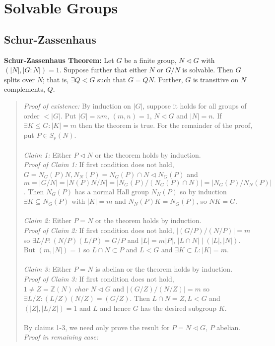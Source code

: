 \chapter{Solvable Groups}
\section {Schur-Zassenhaus}
{\bf Schur-Zassenhaus Theorem:} Let $G$ be a finite group,
$N \lhd G$ with $(|N|, |G:N|)=1$.  Suppose further
that either $N$ or $G/N$ is
solvable. Then $G$ splits over $N$; that is,
$\exists Q < G$ such that $G= QN$.
Further, $G$ is transitive on $N$ complements, $Q$.
\begin{quote}
\emph {Proof of existence:}
By induction on $|G|$, suppose it holds for all groups of order $<|G|$. Put $|G|=nm$,
$(m,n)=1$, $N \lhd G$ and $|N|= n$.  If $\exists K \le G: |K|=m$ then the theorem is true.
For the remainder of the proof, put $P \in S_p(N)$.  
\\
\\
\emph{Claim 1:} Either $P \lhd N$ or the theorem holds by induction.
\\
\emph{Proof of Claim 1:} 
If first condition does not hold,
$G=N_G(P)N, N_N(P)=N_G(P) \cap N \lhd N_G(P)$ and 
$m=|G/N|=|N(P)N/N|=|N_G (P)/(N_G (P) \cap N)|= |N_G(P)/N_N(P)|$.
Then $N_G(P)$ has a
normal Hall group $N_N(P)$ so by induction $\exists K \subseteq N_G(P)$ with
$|K|=m$ and $N_N(P)K=N_G(P)$, so $NK=G$. 
\\
\\
\emph{Claim 2:} Either $P = N$ or the theorem holds by induction.
\\
\emph{Proof of Claim 2:} 
If first condition does not hold,
$|(G/P)/(N/P)|=m$ so $\exists L/P: (N/P)(L/P)= G/P$ and 
$|L|=m |P|$, $|L \cap N| \mid (|L|, |N|)$.
But $(m, |N|)=1$ so $L \cap N \subset P$ and $L<G$ and $\exists K \subset L: |K|=m$.
\\
\\
\emph{Claim 3:} Either $P = N$ is abelian or the theorem holds by induction.
\\
\emph{Proof of Claim 3:} 
If first condition does not hold,
$1 \ne Z= {\mathbb Z}(N) \; char \; N \lhd G$ and
$|(G/Z)/(N/Z)|=m$ so $\exists L/Z: (L/Z)(N/Z)=(G/Z)$. Then $L \cap N =Z, L < G$ and
$(|Z|, |L/Z|)=1$ and $L$ and hence $G$ has the desired subgroup $K$.
\\
\\
By claims 1-3, we need only prove the result for $P=N \lhd G$, $P$ abelian.
\\
\emph{Proof in remaining case:} 

\end{quote}

